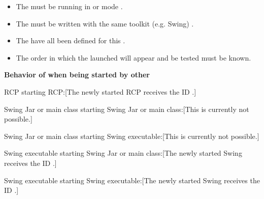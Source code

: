 \begin{itemize}
\item The \gdagent{} must be running in  or  mode .
\item The \gdauts{} must be written with the same toolkit (e.g. Swing) .
\item The \gdauts{} have all been defined for this \gdproject {}.
\item The order in which the launched \gdauts{} will appear and be tested must be known.
\end{itemize}

\textbf{Behavior of \gdauts{} when being started by other \gdauts{}}\\
\begin{description}
\item {RCP starting RCP:}[The newly started RCP \gdaut{} receives the ID .]
\item {Swing Jar or main class starting Swing Jar or main class:}[This is currently not possible.]
\item {Swing Jar or main class starting Swing executable:}[This is currently not possible.]
\item {Swing executable starting Swing Jar or main class:}[The newly started Swing \gdaut{} receives the ID .]
\item {Swing executable starting Swing executable:}[The newly started Swing \gdaut{} receives the ID .]
\end{description}

